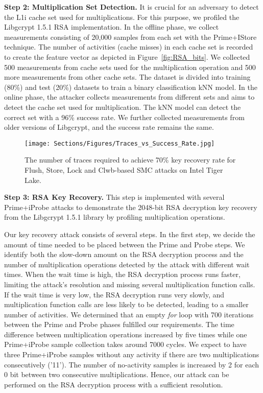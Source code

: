 \noindent\textbf{Step 2: Multiplication Set Detection.}  It is crucial for an adversary to detect the L1i cache set used for multiplications. For this purpose, we profiled the Libgcrypt 1.5.1 RSA implementation. In the offline phase, we collect measurements consisting of 20,000 samples from each set with the Prime+IStore technique. 
The number of activities (cache misses) in each cache set is recorded to create the feature vector as depicted in Figure~\ref{fig:RSA_bits}. We collected 500 measurements from cache sets used for the multiplication operation and 500 more measurements from other cache sets. The dataset is divided into training (80\%) and test (20\%) datasets to train a binary classification kNN model. %
In the online phase, the attacker collects measurements from different sets and aims to detect the cache set used for multiplication. The kNN model can detect the correct set with a 96\% success rate. We further collected measurements from older versions of Libgcrypt, and the success rate remains the same. 

\begin{figure}[t]
    \centering
    {
    \texttt{[image: Sections/Figures/Traces\_vs\_Success\_Rate.jpg]}
    }
    \caption{The number of traces required to achieve 70\% key recovery rate for Flush, Store, Lock and Clwb-based SMC attacks on Intel Tiger Lake.}
    \label{fig:RSA_success_rate}
\end{figure}

\noindent\textbf{Step 3: RSA Key Recovery.} This step is implemented with several Prime+iProbe attacks to demonstrate the 2048-bit RSA decryption key recovery from the Libgcrypt 1.5.1 library by profiling multiplication operations. 

Our key recovery attack consists of several steps. In the first step, we decide the amount of time needed to be placed between the Prime and Probe steps. We identify both the slow-down amount on the RSA decryption process and the number of multiplication operations detected by the attack with different wait times. When the wait time is high, the RSA decryption process runs faster, limiting the attack's resolution and missing several multiplication function calls. If the wait time is very low, the RSA decryption runs very slowly, and multiplication function calls are less likely to be detected, leading to a smaller number of activities. We determined that an empty \textit{for} loop with 700 iterations between the Prime and Probe phases fulfilled our requirements. The time difference between multiplication operations increased by five times while one Prime+iProbe sample collection takes around 7000 cycles. 
We expect to have three Prime+iProbe samples without any activity if there are two multiplications consecutively ('11'). The number of no-activity samples is increased by 2 for each 0 bit between two consecutive multiplications. Hence, our attack can be performed on the RSA decryption process with a sufficient resolution. 


